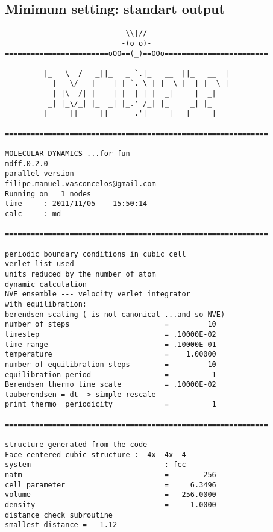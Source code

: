 \documentclass[a4paper]{article}
\begin{document}
\clearpage
\subsection{Minimum setting: standart output}
\begin{verbatim}
                            \\|//                    
                           -(o o)-                           
========================oOO==(_)==OOo========================
          ____    ____  ______   ________  ________  
         |_   \  /   _||_   _ `.|_   __  ||_   __  | 
           |   \/   |    | | `. \ | |_ \_|  | |_ \_| 
           | |\  /| |    | |  | | |  _|     |  _|    
          _| |_\/_| |_  _| |_.' /_| |_     _| |_     
         |_____||_____||______.'|_____|   |_____|    
  
=============================================================

MOLECULAR DYNAMICS ...for fun                 
mdff.0.2.0
parallel version
filipe.manuel.vasconcelos@gmail.com  
Running on   1 nodes                  
time     : 2011/11/05    15:50:14
calc     : md                                                          

=============================================================

periodic boundary conditions in cubic cell     
verlet list used 
units reduced by the number of atom
dynamic calculation
NVE ensemble --- velocity verlet integrator    
with equilibration:             
berendsen scaling ( is not canonical ...and so NVE)
number of steps                      =         10
timestep                             = .10000E-02
time range                           = .10000E-01
temperature                          =    1.00000
number of equilibration steps        =         10
equilibration period                 =          1
Berendsen thermo time scale          = .10000E-02
tauberendsen = dt -> simple rescale
print thermo  periodicity            =          1

=============================================================

structure generated from the code
Face-centered cubic structure :  4x  4x  4  
system                               : fcc                                                         
natm                                 =        256
cell parameter                       =     6.3496
volume                               =   256.0000
density                              =     1.0000
distance check subroutine
smallest distance =   1.12


\end{verbatim}
\end{document}
